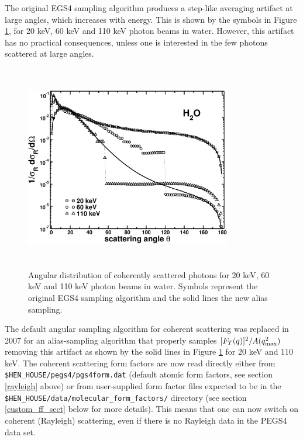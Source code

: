 The original EGS4 sampling algorithm produces a step-like averaging 
artifact at large angles, which increases with energy. This is 
shown by the symbols in Figure \ref{ray_ang_sampling_fig}, for 
20 keV, 60 keV and 110 keV photon beams in water. 
However, this artifact has no practical consequences, unless one is 
interested in the few photons scattered at large angles.
\begin{figure}[h]
\includegraphics[height=9cm,width=9cm]{figures/ray_ang_dist_old_vs_new}
\caption[Angular distribution of coherently scattered photons for 20 keV, 60 keV 
and 110 keV photon beams in water.]{\label{ray_ang_sampling_fig}
Angular distribution of coherently scattered photons for 20 keV, 60 keV 
and 110 keV photon beams in water. Symbols represent the original EGS4
sampling algorithm and the solid lines the new alias sampling.
}
\end{figure}

The default angular sampling algorithm for coherent scattering 
was replaced in 2007 for an alias-sampling algorithm that properly 
samples $[F_T(q)]^2/A(q_{\rm max}^2)$ removing this artifact as shown
by the solid lines in Figure \ref{ray_ang_sampling_fig} for 20 keV
and 110 keV. The coherent scattering form factors are now
read directly either from {\tt \$HEN\_HOUSE/pegs4/pgs4form.dat} 
(default atomic form factors, see section \ref{rayleigh} above) or from
user-supplied form factor files expected to be in the
{\tt \$HEN\_HOUSE/data/molecular\_form\_factors/} directory
(see section \ref{custom_ff_sect} below for more details).
This means that one can now switch on coherent (Rayleigh) scattering,
even if there is no Rayleigh data in the PEGS4 data set.

